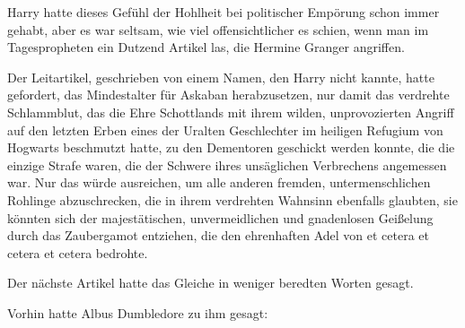 Harry hatte dieses Gefühl der Hohlheit bei politischer Empörung schon immer gehabt, aber es war seltsam, wie viel offensichtlicher es schien, wenn man im Tagespropheten ein Dutzend Artikel las, die Hermine Granger angriffen.

Der Leitartikel, geschrieben von einem Namen, den Harry nicht kannte, hatte gefordert, das Mindestalter für Askaban herabzusetzen, nur damit das verdrehte Schlammblut, das die Ehre Schottlands mit ihrem wilden, unprovozierten Angriff auf den letzten Erben eines der Uralten Geschlechter im heiligen Refugium von Hogwarts beschmutzt hatte, zu den Dementoren geschickt werden konnte, die die einzige Strafe waren, die der Schwere ihres unsäglichen Verbrechens angemessen war. Nur das würde ausreichen, um alle anderen fremden, untermenschlichen Rohlinge abzuschrecken, die in ihrem verdrehten Wahnsinn ebenfalls glaubten, sie könnten sich der majestätischen, unvermeidlichen und gnadenlosen Geißelung durch das Zaubergamot entziehen, die den ehrenhaften Adel von et cetera et cetera et cetera bedrohte.

Der nächste Artikel hatte das Gleiche in weniger beredten Worten gesagt.

Vorhin hatte Albus Dumbledore zu ihm gesagt:

